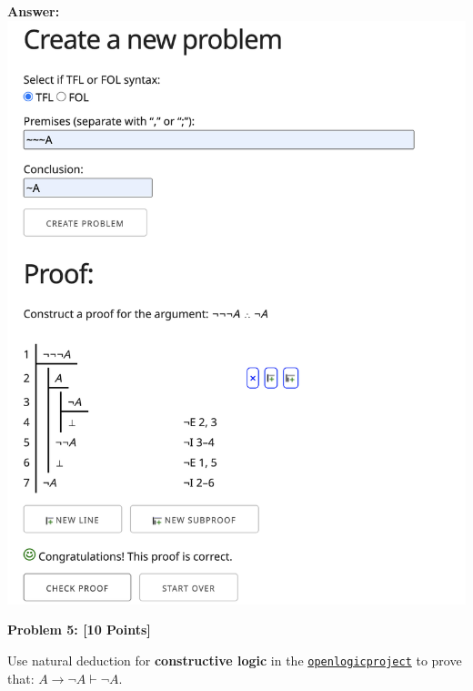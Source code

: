 \documentclass[12pt]{article}
\newcommand{\TURN}{\vdash}
\newcommand{\IMPLIES}{\rightarrow}
\newcommand{\Problem}[3]{\mbox{} \newline \noindent \textbf{\textbf{Problem #1: #2 [#3 Points] \\ }}}
\begin{document}
\bf{Answer:}
\includegraphics[scale = 0.4]{hw2pr4.png}

\Problem{5}{}{10}

Use natural deduction for \textbf{constructive logic}  in the \href{http://proofs.openlogicproject.org}{\texttt{openlogicproject}} to prove  that:  $A \IMPLIES \neg A \TURN \neg A$.
\end{document}
